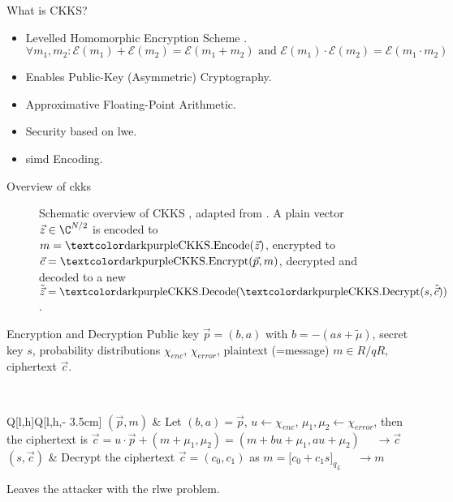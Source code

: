 \begin{frame}{What is CKKS?}
  \begin{itemize}
    \item Levelled Homomorphic Encryption Scheme \cite{2017-ckks-original}.
          $$\forall m_1, m_2: \mathcal{E}(m_1) + \mathcal{E}(m_2) = \mathcal{E}(m_1 + m_2) \text{ and } \mathcal{E}(m_1) \cdot \mathcal{E}(m_2) = \mathcal{E}(m_1 \cdot m_2)$$
    \item Enables Public-Key (Asymmetric) Cryptography.
    \item Approximative Floating-Point Arithmetic.
    \item Security based on \glsdesc{lwe}.
    \item \gls{simd} Encoding.
  \end{itemize}
\end{frame}

\begin{frame}{Overview of \gls{ckks}}
  \begin{figure}[H]
    \centering
    \caption[Schematic overview of the CKKS scheme]{
      Schematic overview of CKKS \parencite{2017-ckks-original}, adapted from \cite{2020-cryptotree}.
      A plain vector $\vec{z} \in \C^{N/2}$ is encoded to $m = \cryptop{CKKS.Encode}(\vec{z})$, encrypted to $\vec{c} = \cryptop{CKKS.Encrypt}(\vec{p}, m)$, decrypted and decoded to a new $\tilde{\vec{z}} = \cryptop{CKKS.Decode}(\cryptop{CKKS.Decrypt}(s, \tilde{\vec{c}}))$.
    }
    \label{fig:ckks-overview}
  \end{figure}
\end{frame}

\begin{frame}{Encryption and Decryption}
  Public key $\vec{p} = (b, a)$ with $b = -(as + \tilde{\mu})$, secret key $s$, probability distributions $\chi_{enc}$, $\chi_{error}$, plaintext (=message) $m \in R/qR$, ciphertext $\vec{c}$.

   \\
  \begin{tblr}{Q[l,h]Q[l,h,\textwidth - 3.5cm]}
    $(\vec{p}, m)$ & {
        Let $(b,a) = \vec{p}$, $u \leftarrow \chi_{enc}$, $\mu_1, \mu_2 \leftarrow \chi_{error}$,
        then the ciphertext is $\vec{c} = u \cdot \vec{p} + (m + \mu_1, \mu_2) = (m + bu + \mu_1, au + \mu_2)$
        $\quad\rightarrow \vec{c}$} \\
    $(s, \vec{c})$ & {
        Decrypt the ciphertext $\vec{c} = (c_0, c_1)$ as $m = \lbrack c_0 + c_1 s\rbrack_{q_L}$
        $\quad\rightarrow m$} \\
  \end{tblr}

  Leaves the attacker with the \gls{rlwe} problem.
\end{frame}

